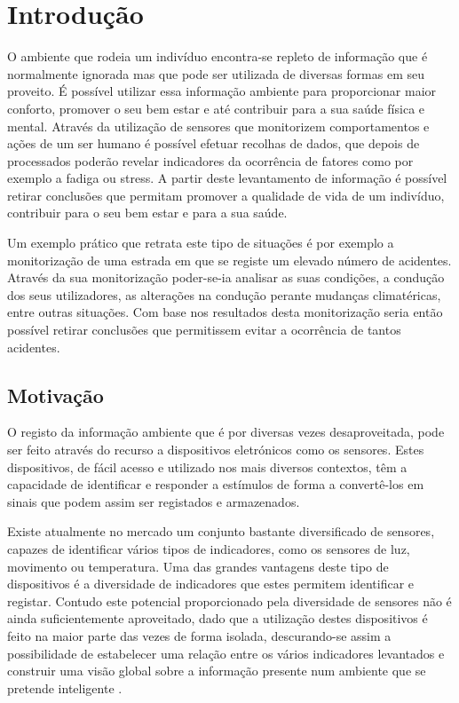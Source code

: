\chapter{Introdução}

O ambiente que rodeia um indivíduo encontra-se repleto de informação que é normalmente ignorada mas que pode ser utilizada de diversas formas em seu proveito. É possível utilizar essa informação ambiente para proporcionar maior conforto, promover o seu bem estar e até contribuir para a sua saúde física e mental. Através da utilização de sensores que monitorizem comportamentos e ações de um ser humano é possível efetuar recolhas de dados, que depois de processados poderão revelar indicadores da ocorrência de fatores como por exemplo a fadiga ou stress. A partir deste levantamento de informação é possível retirar conclusões que permitam promover a qualidade de vida de um indivíduo, contribuir para o seu bem estar e para a sua saúde. 

Um exemplo prático que retrata este tipo de situações é por exemplo a monitorização de uma estrada em que se registe um elevado número de acidentes. Através da sua monitorização poder-se-ia analisar as suas condições, a condução dos seus utilizadores, as alterações na condução perante mudanças climatéricas, entre outras situações. Com base nos resultados desta monitorização seria então possível retirar conclusões que permitissem evitar a ocorrência de tantos acidentes.


\section{Motivação}
O registo da informação ambiente que é por diversas vezes desaproveitada, pode ser feito através do recurso a dispositivos eletrónicos como os sensores. Estes dispositivos, de fácil acesso e utilizado nos mais diversos contextos, têm a capacidade de identificar e responder a estímulos de forma a convertê-los em sinais que podem assim ser registados e armazenados\cite{akyildiz2002wireless}. 

Existe atualmente no mercado um conjunto bastante diversificado de sensores, capazes de identificar vários tipos de indicadores, como os sensores de luz, movimento ou temperatura. Uma das grandes vantagens deste tipo de dispositivos é a diversidade de indicadores que estes permitem identificar e registar. Contudo este potencial proporcionado pela diversidade de sensores não é ainda suficientemente aproveitado, dado que a utilização destes dispositivos é feito na maior parte das vezes de forma isolada, descurando-se assim a possibilidade de estabelecer uma relação entre os vários indicadores levantados e construir uma visão global \cite{salber1999designing} sobre a informação presente num ambiente que se pretende inteligente \cite{ducatel2001scenarios, ducatel2003ambient}.

